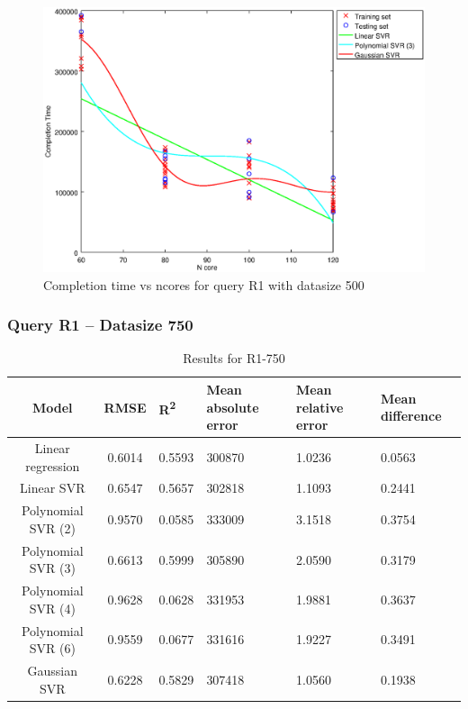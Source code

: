 \documentclass[a4paper,11pt]{article}
\begin{document}
\begin {figure}[hbtp]
\centering
\includegraphics[width=\textwidth]{output/R1_500_ONLY_1_LINEAR_NCORE/plot_R1_500_bestmodels.eps}
\caption{Completion time vs ncores for query R1 with datasize 500}
\label{fig:coreonly_linear_R1_500}
\end {figure}

\newpage
\subsubsection{Query R1 -- Datasize 750}
\begin{table}[H]
	\centering
	\begin{adjustbox}{center}
		\begin{tabular}{c | c M{1.2cm} M{2.5cm} M{2.5cm} M{1.8cm}}
			Model & RMSE & R\textsuperscript{2} & Mean absolute error & Mean relative error & Mean difference \tabularnewline
			\hline
			Linear regression & 0.6014 & 0.5593 & 300870 & 1.0236 & 0.0563 \\
			Linear SVR & 0.6547 & 0.5657 & 302818 & 1.1093 & 0.2441 \\
			Polynomial SVR (2) & 0.9570 & 0.0585 & 333009 & 3.1518 & 0.3754 \\
			Polynomial SVR (3) & 0.6613 & 0.5999 & 305890 & 2.0590 & 0.3179 \\
			Polynomial SVR (4) & 0.9628 & 0.0628 & 331953 & 1.9881 & 0.3637 \\
			Polynomial SVR (6) & 0.9559 & 0.0677 & 331616 & 1.9227 & 0.3491 \\
			Gaussian SVR & 0.6228 & 0.5829 & 307418 & 1.0560 & 0.1938 \\
		\end{tabular}
	\end{adjustbox}
	\\
	\caption{Results for R1-750}
	\label{fig:coreonly_linear_R1_750}
\end{table}
\end{document}
